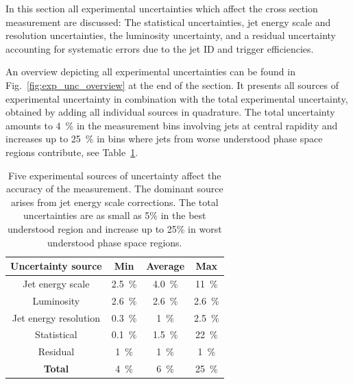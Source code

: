 In this section all experimental uncertainties which affect the cross
section measurement are discussed: The statistical uncertainties, jet energy
scale and resolution uncertainties, the luminosity uncertainty, and
a residual uncertainty accounting for systematic errors due to the jet ID and
trigger efficiencies. 

An overview depicting all experimental uncertainties can be found in
Fig.~\ref{fig:exp_unc_overview} at the end of the section. It presents all
sources of experimental uncertainty in combination with the total experimental
uncertainty, obtained by adding all individual sources in quadrature. The total
uncertainty amounts to \SI{4}{\percent} in the measurement bins involving jets at central
rapidity and increases up to \SI{25}{\percent} in bins where jets from worse understood
phase space regions contribute, see Table~\ref{tab:data:expunc}.

\begin{table}[htbp]
    \centering
    \caption[Summary of experimental uncertainties]
       {Five experimental sources of uncertainty affect the accuracy of the
        measurement. The dominant source arises from jet energy scale
        corrections. The total uncertainties are as small as 5\% in the best understood
        region and increase up to 25\% in worst understood phase space regions.}
    \label{tab:data:expunc}
    \begin{tabular}{cccc}
    \toprule
    \textbf{Uncertainty source} & \textbf{Min}       & \textbf{Average}   & \textbf{Max}\\\midrule
    Jet energy scale            & \SI{2.5}{\percent} & \SI{4.0}{\percent} & \SI{11}{\percent}\\
    Luminosity                  & \SI{2.6}{\percent} & \SI{2.6}{\percent} & \SI{2.6}{\percent}\\
    Jet energy resolution       & \SI{0.3}{\percent} & \SI{1}{\percent} & \SI{2.5}{\percent}\\
    Statistical                 & \SI{0.1}{\percent} & \SI{1.5}{\percent} & \SI{22}{\percent}\\
    Residual                    & \SI{1}{\percent} & \SI{1}{\percent} & \SI{1}{\percent}\\\midrule
    \textbf{Total}              & \SI{4}{\percent} & \SI{6}{\percent} & \SI{25}{\percent}\\
    \bottomrule
    \end{tabular}
\end{table}

